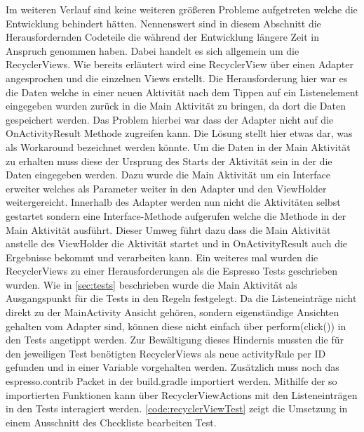 Im weiteren Verlauf sind keine weiteren größeren Probleme aufgetreten welche die Entwicklung behindert hätten. Nennenswert sind in diesem Abschnitt die Herausfordernden Codeteile die während der Entwicklung längere Zeit in Anspruch genommen haben. Dabei handelt es sich allgemein um die RecyclerViews. Wie bereits erläutert wird eine RecyclerView über einen Adapter angesprochen und die einzelnen Views erstellt. Die Herausforderung hier war es die Daten welche in einer neuen Aktivität  nach dem Tippen auf ein Listenelement eingegeben wurden zurück in die Main Aktivität zu bringen, da dort die Daten gespeichert werden. Das Problem hierbei war dass der Adapter nicht auf die OnActivityResult Methode zugreifen kann. Die Lösung stellt hier etwas dar, was als Workaround bezeichnet werden könnte. Um die Daten in der Main Aktivität zu erhalten muss diese der Ursprung des Starts der Aktivität sein in der die Daten eingegeben werden. Dazu wurde die Main Aktivität um ein Interface erweiter welches als Parameter weiter in den Adapter und den ViewHolder weitergereicht. Innerhalb des Adapter werden nun nicht die Aktivitäten selbst gestartet sondern eine Interface-Methode aufgerufen welche die Methode in der Main Aktivität ausführt. Dieser Umweg führt dazu dass die Main Aktivität anstelle des ViewHolder die Aktivität startet und in OnActivityResult auch die Ergebnisse bekommt und verarbeiten kann. Ein weiteres mal wurden die RecyclerViews zu einer Herausforderungen als die Espresso Tests geschrieben wurden. Wie in \autoref{sec:tests} beschrieben wurde die Main Aktivität als Ausgangspunkt für die Tests in den Regeln festgelegt. Da die Listeneinträge nicht direkt zu der MainActivity Ansicht gehören, sondern eigenständige Ansichten gehalten vom Adapter sind, können diese nicht einfach über perform(click()) in den Tests angetippt werden. Zur Bewältigung dieses Hindernis mussten die für den jeweiligen Test benötigten RecyclerViews als neue activityRule per ID gefunden und in einer Variable vorgehalten werden. Zusätzlich muss noch das espresso.contrib Packet in der build.gradle importiert werden. Mithilfe der so importierten Funktionen kann über RecyclerViewActions mit den Listeneinträgen in den Tests interagiert werden. \autoref{code:recyclerViewTest} zeigt die Umsetzung in einem Ausschnitt des Checkliste bearbeiten Test.
\\



